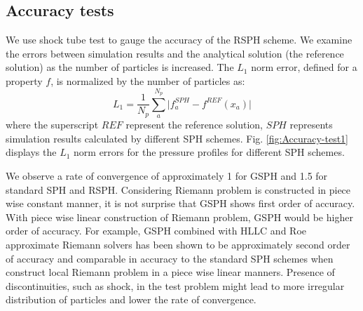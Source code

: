 \subsection{Accuracy tests}
We use shock tube test to gauge the accuracy of the RSPH scheme.
We examine the errors between simulation results and the analytical solution (the reference solution) as the number of particles is increased. The $L_1$ norm error, defined for a property $f$, is normalized by the number of particles as:
\begin{equation}
L_1= \frac{1}{N_p} \sum_a^{N_p} \vert f_a^{SPH} - f^{REF} (x_a) \vert 
\end{equation}
where the superscript $REF$ represent the reference solution, $SPH$ represents simulation results calculated by different SPH schemes. Fig. \ref{fig:Accuracy-test1} displays the $L_1$ norm errors for the pressure profiles for different SPH schemes.


We observe a rate of convergence of approximately 1 for GSPH and 1.5 for standard SPH and RSPH.  Considering Riemann problem is constructed in piece wise constant manner, it is not surprise that GSPH shows first order of accuracy. With piece wise linear construction of Riemann problem, GSPH would be higher order of accuracy. For example,
GSPH combined with HLLC and Roe approximate Riemann solvers has been shown to be approximately second order of accuracy \citep{puri2014comparison} and comparable in accuracy to the standard SPH schemes when construct local Riemann problem in a piece wise linear manners. Presence of discontinuities, such as shock, in the test problem might lead to more irregular distribution of particles and lower the rate of convergence. 

